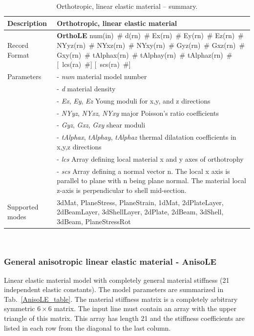 \documentclass[a4paper]{article}
\newcommand{\descitem}[1]{{\noindent \bf #1}}
\newcommand{\elemparam}[2]{{{#1\tiny (#2)}~\#}}
\newcommand{\optelemparam}[2]{[{~\elemparam{#1}{#2}}]}
\newcommand{\param}[1]{{\it #1}}
\newenvironment{mmt}{\begin{tabular}{|l|p{9cm}|}}{\end{tabular}\\}
\newenvironment{mmt}{\begin{tabular}{|l|l|}}{\end{tabular}\\}
\begin{document}
\begin{table}[!htb]
\begin{mmt}
\hline
Description & Orthotropic, linear elastic material\\
\hline
Record Format & \descitem{OrthoLE} \elemparam{num}{in}
\elemparam{d}{rn} \elemparam{Ex}{rn} \elemparam{Ey}{rn}
\elemparam{Ez}{rn} \elemparam{NYyz}{rn} \elemparam{NYxz}{rn} \elemparam{NYxy}{rn}
\elemparam{Gyz}{rn} \elemparam{Gxz}{rn} \elemparam{Gxy}{rn}
\elemparam{tAlphax}{rn} \elemparam{tAlphay}{rn}
\elemparam{tAlphaz}{rn} \optelemparam{lcs}{ra} \optelemparam{scs}{ra}\\
Parameters &- \param{num} material model number\\
&- \param{d} material density\\
&- \param{Ex}, \param{Ey}, \param{Ez} Young moduli for x,y, and z directions\\
&- \param{NYyz}, \param{NYxz}, \param{NYxy} major Poisson's ratio
coefficients\\
&- \param{Gyz}, \param{Gxz}, \param{Gxy} shear moduli \\
&- \param{tAlphax}, \param{tAlphay}, \param{tAlphaz} thermal
dilatation coefficients in x,y,z directions\\
&- \param{lcs} Array defining local material x and y axes of orthotrophy\\
&- \param{scs} Array defining a normal vector n. The local x axis is
parallel to plane with n being plane normal. The material local z-axis
is perpendicular to shell mid-section.\\
Supported modes& 3dMat, PlaneStress, PlaneStrain, 1dMat,
2dPlateLayer, 2dBeamLayer, 3dShellLayer, 2dPlate, 2dBeam, 3dShell,
3dBeam, PlaneStressRot\\
\hline
\end{mmt}
\caption{Orthotropic, linear elastic material -- summary.}
\label{OrthoLE_table}
\end{table}

\subsubsection{General anisotropic linear elastic material - AnisoLE}
\label{AnisoLE}
Linear elastic  material model with completely general material stiffness (21 independent elastic constants). 
The model parameters are summarized
in Tab.~\ref{AnisoLE_table}. The material stiffness matrix is a completely arbitrary symmetric $6\times 6$ matrix.
The input line must contain an array with the upper triangle of this matrix.
This array has length 21 and the stiffness coefficients are listed in each row from the diagonal to the last column.
\end{document}
